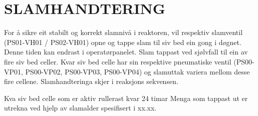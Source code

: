 \newpage
\section{SLAMHANDTERING}
For å sikre eit stabilt og korrekt slamnivå i reaktoren, vil respektiv slamventil (PS01-VH01 / PS02-VH01) opne og tappe slam til siv bed ein gong i døgnet.
 Denne tiden kan endrast i operatørpanelet. Slam tappast ved sjølvfall til ein av fire siv bed celler. 
 Kvar siv bed celle har sin respektive pneumatiske ventil (PS00-VP01, PS00-VP02, PS00-VP03, PS00-VP04) og slamuttak variera mellom desse fire cellene. Slamhandteringa skjer i reaksjons sekvensen.

Kva siv bed celle som er aktiv rullerast kvar 24 timar
Menga som tappast ut er utrekna ved hjelp av slamalder spesifisert i xx.xx.
